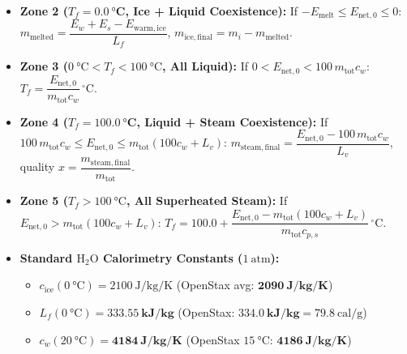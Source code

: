 \documentclass[10pt,twoside,openany,letterpaper]{book}
\begin{document}
\begin{quicksheet}
\begin{twocol}[0.52]
\begin{formulacard}
\begin{itemize}
\begin{enumerate}
\begin{itemize}
      $T_f = -\dfrac{E_{\mathrm{warm,ice}} - E_w - E_s - (m_w+m_s)L_f}{m_{\mathrm{tot}}c_{\mathrm{ice}}}\,^\circ\mathrm{C}$.
      \item \textbf{Zone 2 ($T_f = \mathbf{\SI{0.0}{\celsius}}$, Ice + Liquid Coexistence):} If $-E_{\mathrm{melt}} \le E_{\mathrm{net},0} \le 0$:
      $m_{\mathrm{melted}} = \dfrac{E_w + E_s - E_{\mathrm{warm,ice}}}{L_f}$, $m_{\mathrm{ice,final}} = m_i - m_{\mathrm{melted}}$.
      \item \textbf{Zone 3 ($\SI{0}{\celsius} < T_f < \SI{100}{\celsius}$, All Liquid):} If $0 < E_{\mathrm{net},0} < 100\,m_{\mathrm{tot}}c_w$:
      $\boxed{T_f = \dfrac{E_{\mathrm{net},0}}{m_{\mathrm{tot}}c_w}\,^\circ\mathrm{C}}$.
      \item \textbf{Zone 4 ($T_f = \mathbf{\SI{100.0}{\celsius}}$, Liquid + Steam Coexistence):} If $100\,m_{\mathrm{tot}}c_w \le E_{\mathrm{net},0} \le m_{\mathrm{tot}}(100c_w + L_v)$:
      $m_{\mathrm{steam,final}} = \dfrac{E_{\mathrm{net},0} - 100\,m_{\mathrm{tot}}c_w}{L_v}$, quality $x = \dfrac{m_{\mathrm{steam,final}}}{m_{\mathrm{tot}}}$.
      \item \textbf{Zone 5 ($T_f > \SI{100}{\celsius}$, All Superheated Steam):} If $E_{\mathrm{net},0} > m_{\mathrm{tot}}(100c_w + L_v)$:
      $T_f = 100.0 + \dfrac{E_{\mathrm{net},0} - m_{\mathrm{tot}}(100c_w + L_v)}{m_{\mathrm{tot}}c_{p,s}}\,^\circ\mathrm{C}$.
    \end{itemize}
  \end{enumerate}
\end{itemize}
\end{formulacard}
\nextcol[0.46]
\begin{formulacard}
\scriptsize
\begin{itemize}
  \item \textbf{Standard $\mathrm{H_2O}$ Calorimetry Constants ($\SI{1}{\text{atm}}$):}
  \begin{itemize}
    \item $c_{\mathrm{ice}}(\SI{0}{\celsius}) = \SI{2100}{\joule\per\kilogram\per\kelvin}$ (OpenStax avg: $\mathbf{\SI{2090}{\joule\per\kilogram\per\kelvin}}$)
    \item $L_f(\SI{0}{\celsius}) = \mathbf{\SI{333.55}{\kilo\joule\per\kilogram}}$ (OpenStax: $\mathbf{\SI{334.0}{\kilo\joule\per\kilogram}} = \SI{79.8}{\text{cal}\per\gram}$)
    \item $c_w(\SI{20}{\celsius}) = \mathbf{\SI{4184}{\joule\per\kilogram\per\kelvin}}$ (OpenStax $\SI{15}{\celsius}$: $\mathbf{\SI{4186}{\joule\per\kilogram\per\kelvin}}$)

\end{itemize}
\end{itemize}
\end{formulacard}
\end{twocol}
\end{quicksheet}
\end{document}
